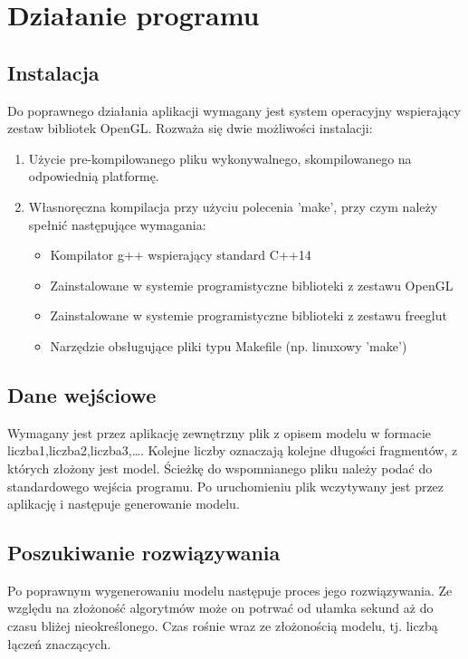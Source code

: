 \chapter{Działanie programu}
\thispagestyle{chapterBeginStyle}

\section{Instalacja}

Do poprawnego działania aplikacji wymagany jest system operacyjny wspierający zestaw bibliotek OpenGL. Rozważa się dwie możliwości instalacji:
\begin{enumerate}
\item Użycie pre-kompilowanego pliku wykonywalnego, skompilowanego na odpowiednią platformę.
\item Własnoręczna kompilacja przy użyciu polecenia 'make', przy czym należy spełnić następujące wymagania: 
	\begin{itemize}
	\item Kompilator g++ wspierający standard C++14
	\item Zainstalowane w systemie programistyczne biblioteki z zestawu OpenGL
	\item Zainstalowane w systemie programistyczne biblioteki z zestawu freeglut
	\item Narzędzie obsługujące pliki typu Makefile (np. linuxowy 'make')
	\end{itemize}
\end{enumerate}

\section{Dane wejściowe}

Wymagany jest przez aplikację zewnętrzny plik z opisem modelu w formacie {liczba1,liczba2,liczba3,\ldots}. Kolejne liczby oznaczają kolejne długości fragmentów, z których złożony jest model. Ścieżkę do wspomnianego pliku należy podać do standardowego wejścia programu. Po uruchomieniu plik wczytywany jest przez aplikację i następuje generowanie modelu.

\section{Poszukiwanie rozwiązywania}

Po poprawnym wygenerowaniu modelu następuje proces jego rozwiązywania. Ze względu na złożoność algorytmów może on potrwać od ułamka sekund aż do czasu bliżej nieokreślonego. Czas rośnie wraz ze złożonością modelu, tj. liczbą łączeń znaczących.

